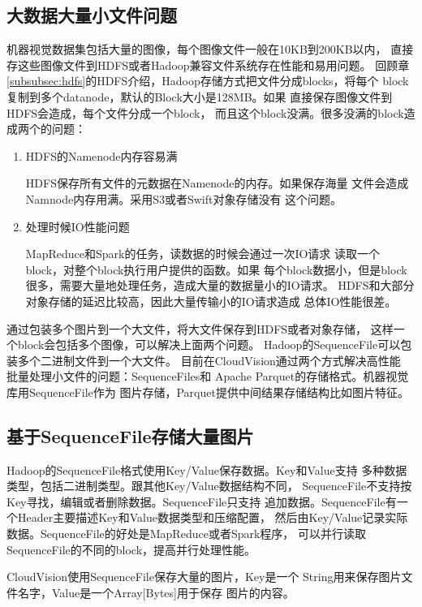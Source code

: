 \subsection{大数据大量小文件问题}
\label{subsec:big-data-small-files}
机器视觉数据集包括大量的图像，每个图像文件一般在10KB到200KB以内，
直接存这些图像文件到HDFS或者Hadoop兼容文件系统存在性能和易用问题。
回顾章\ref{subsubsec:hdfs}的HDFS介绍，Hadoop存储方式把文件分成blocks，将每个
block复制到多个datanode，默认的Block大小是128MB。如果
直接保存图像文件到HDFS会造成，每个文件分成一个block，
而且这个block没满。很多没满的block造成两个的问题：
\begin{enumerate}
  \item HDFS的Namenode内存容易满

        HDFS保存所有文件的元数据在Namenode的内存。如果保存海量
        文件会造成Namnode内存用满。采用S3或者Swift对象存储没有
        这个问题。

  \item 处理时候IO性能问题
        
        MapReduce和Spark的任务，读数据的时候会通过一次IO请求
        读取一个block，对整个block执行用户提供的函数。如果
        每个block数据小，但是block很多，需要大量地处理任务，造成大量的数据量小的IO请求。
        HDFS和大部分对象存储的延迟比较高，因此大量传输小的IO请求造成
        总体IO性能很差。
\end{enumerate}


通过包装多个图片到一个大文件，将大文件保存到HDFS或者对象存储，
这样一个block会包括多个图像，可以解决上面两个问题。
Hadoop的SequenceFile可以包装多个二进制文件到一个大文件。
目前在CloudVision通过两个方式解决高性能
批量处理小文件的问题：SequenceFiles和
Apache Parquet的存储格式。机器视觉库用SequenceFile作为
图片存储，Parquet提供中间结果存储结构比如图片特征。


\subsection{基于SequenceFile存储大量图片}
\label{subsec:seq-file}
Hadoop的SequenceFile格式使用Key/Value保存数据。Key和Value支持
多种数据类型，包括二进制类型。跟其他Key/Value数据结构不同，
SequenceFile不支持按Key寻找，编辑或者删除数据。SequenceFile只支持
追加数据。SequenceFile有一个Header主要描述Key和Value数据类型和压缩配置，
然后由Key/Value记录实际数据。SequenceFile的好处是MapReduce或者Spark程序，
可以并行读取SequenceFile的不同的block，提高并行处理性能。

CloudVision使用SequenceFile保存大量的图片，Key是一个
String用来保存图片文件名字，Value是一个Array[Bytes]用于保存
图片的内容。

